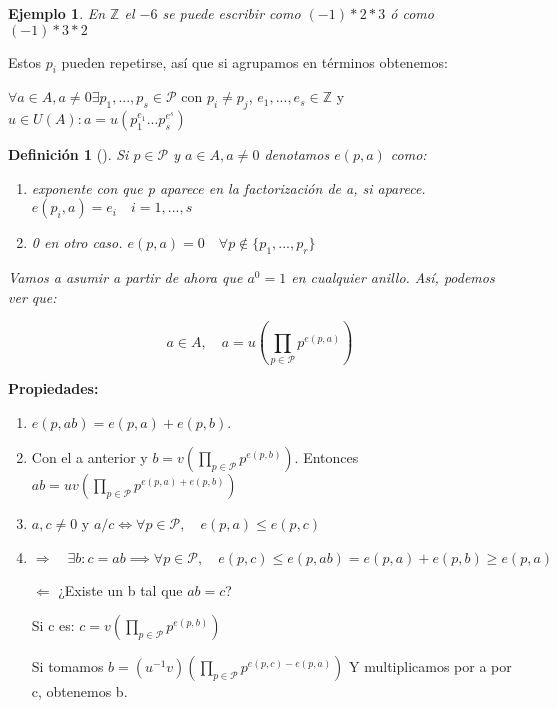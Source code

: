 \documentclass[11pt, a4paper, titlepage]{article}
\makeatletter
\renewenvironment{proof}[1][\proofname] {\vspace{-15pt}\par\pushQED{\qed}\normalfont\topsep6\p@\@plus6\p@\relax\trivlist\item[\hskip\labelsep\it#1\@addpunct{.}]\ignorespaces}{\popQED\endtrivlist\@endpefalse}
\providecommand{\ent}{\mathbb{Z}}
\theoremstyle{theorem-style}
\theoremstyle{definition-style}
\newtheorem*{ndef}{Definición}
\theoremstyle{remark-style}
\theoremstyle{example-style}
\newtheorem*{ejemplo}{Ejemplo}
\newenvironment{nlist}
{\begin{enumerate}
\renewcommand\labelenumi{(\emph{\roman{enumi})}}}
{\end{enumerate}}
\makeatother
\begin{document}
\begin{ejemplo}
	En $\ent$ el $-6$ se puede escribir como $(-1)*2*3$ ó como $(-1)*3*2$
\end{ejemplo}

Estos $p_i$ pueden repetirse, así que si agrupamos en términos obtenemos:

$\forall a \in A, a \ne 0 \exists p_1,...,p_s \in \mathcal{P}$ con $p_i \ne p_j$, $e_1,...,e_s \in \ent$ y $ u \in U(A) : a = u(p_1^{e_1}...p_s^{e^s})$


\begin{ndef}[]
	Si $p\in \mathcal{P}$ y $a \in A, a \ne 0$ denotamos $e(p,a)$ como:
	\begin{nlist}
	\item exponente con que p aparece en la factorización de a, si aparece. $e(p_i,a) = e_i \quad i = 1,...,s$
	\item 0 en otro caso. $e(p,a) = 0 \quad \forall p \notin \{p_1,...,p_r\}$

\end{nlist}
	
	Vamos a asumir a partir de ahora que $a^0  = 1 $ en cualquier anillo. Así, podemos ver que:
	
	$$ a \in A, \quad a = u(\prod _{p \in \mathcal{P}}p^{e(p,a)})$$
\end{ndef}

\textbf{Propiedades:}
\begin{nlist}
	\item $e(p,ab) = e(p,a) + e(p,b)$.\\
	
	\begin{proof}
	
	Con el a anterior y $b= v(\prod _{p \in \mathcal{P}}p^{e(p,b)})$. Entonces $ab = uv(\prod _{p \in \mathcal{P}}p^{e(p,a)+ e(p,b)})$
\end{proof}

\item $a,c \ne 0$ y $a/c \iff \forall p \in \mathcal{P}, \quad e(p,a) \leq e(p,c)$\\

\begin{proof}
	$\boxed{\Rightarrow} \quad \exists b: c =ab \implies \forall p \in \mathcal{P}, \quad e(p,c) \leq e(p,ab) = e(p,a)+e(p,b) \geq e(p,a) $
	
	$\boxed{\Leftarrow} $ ¿Existe un b tal que $ab= c$? 
	
	Si c es: $c = v(\prod _{p \in \mathcal{P}}p^{e(p,b)})$
	
	Si tomamos $b = (u^{-1}v)(\prod _{p \in \mathcal{P}}p^{e(p,c) - e(p,a)}) $ Y multiplicamos por a por c, obtenemos b.
\end{proof}
\end{nlist}
\end{document}
